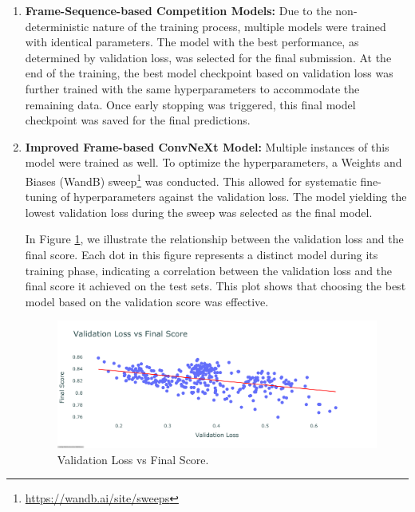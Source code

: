 \documentclass[a4paper,12pt,openright]{book}
\begin{document}
\begin{enumerate}
    \item \textbf{Frame-Sequence-based Competition Models:}
Due to the non-deterministic nature of the training process, multiple models were trained with identical parameters. The model with the best performance, as determined by validation loss, was selected for the final submission. At the end of the training, the best model checkpoint based on validation loss was further trained with the same hyperparameters to accommodate the remaining data. Once early stopping was triggered, this final model checkpoint was saved for the final predictions.
 \item \textbf{Improved Frame-based ConvNeXt Model:}
        Multiple instances of this model were trained as well. To optimize the hyperparameters, a Weights and Biases (WandB) sweep\footnote{\label{wandbsweps}\url{https://wandb.ai/site/sweeps}} was conducted. This allowed for systematic fine-tuning of hyperparameters against the validation loss. The model yielding the lowest validation loss during the sweep was selected as the final model. 

      In Figure \ref{fig:ValidationVsFinalScore}, we illustrate the relationship between the validation loss and the final score. Each dot in this figure represents a distinct model during its training phase, indicating a correlation between the validation loss and the final score it achieved on the test sets. This plot shows that choosing the best model based on the validation score was effective.





    \begin{figure}[H]
    \centering
    \includegraphics[trim={0cm 1cm 0cm 4cm},clip,width=1.1\textwidth]{images/plot.pdf}
    \caption{Validation Loss vs Final Score.}
    \label{fig:ValidationVsFinalScore}
\end{figure}

 
\end{enumerate}
\newpage
\end{document}
